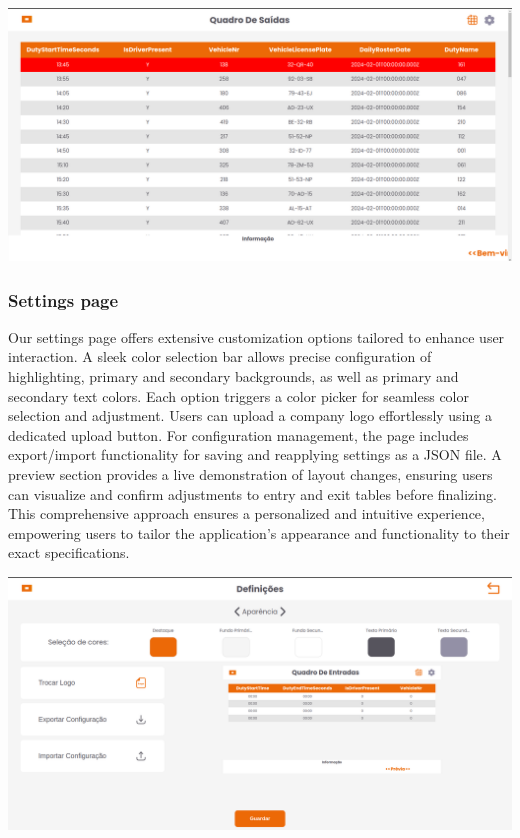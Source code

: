 \documentclass[10pt]{article}
\begin{document}
            \vfill

            \vfill
        \includegraphics[width=1\textwidth]{table_of_exits}
            \vfill

        \subsubsection{Settings page}

        Our settings page offers extensive customization options tailored to enhance user interaction. A sleek color selection bar allows precise configuration of highlighting, primary and secondary backgrounds, as well as primary and secondary text colors. Each option triggers a color picker for seamless color selection and adjustment.
        Users can upload a company logo effortlessly using a dedicated upload button. For configuration management, the page includes export/import functionality for saving and reapplying settings as a JSON file. A preview section provides a live demonstration of layout changes, ensuring users can visualize and confirm adjustments to entry and exit tables before finalizing.
        This comprehensive approach ensures a personalized and intuitive experience, empowering users to tailor the application's appearance and functionality to their exact specifications.



            \vfill
        \includegraphics[width=1\textwidth]{aparencia}
            \vfill
\end{document}
